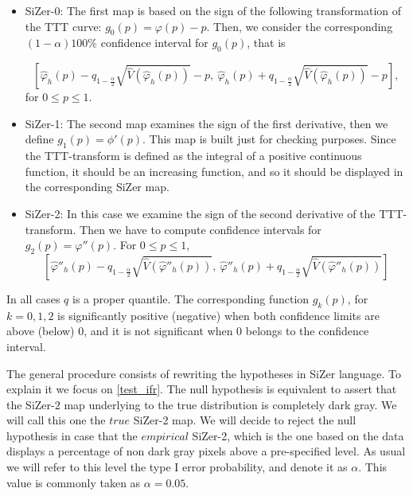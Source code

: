 \documentclass[preprint,12pt]{elsarticle}
\begin{document}
\begin{itemize}
\item SiZer-0:
\noindent The first map is based on the sign of the following transformation of the  TTT curve: $g_0(p)=\varphi(p) - p$.
Then, we consider the corresponding $(1-\alpha)100\%$ confidence interval for $g_0(p)$, that is 

\[
\left[\widehat{\varphi}_h(p)-q_{1-\frac{\alpha}{2}}\sqrt{\widehat{V}\left(\widehat{\varphi}_h(p)\right)}-p, \ \widehat{\varphi}_h(p)+q_{1-\frac{\alpha}{2}}\sqrt{\widehat{V}\left(\widehat{\varphi}_h(p)\right) }- p \right],
\]
\noindent for $0\leq p \leq 1$.


\item SiZer-1:
\noindent The second map examines the sign of the first derivative, then we define $g_1(p)=\phi'(p)$. This map is built just for checking purposes. Since the TTT-transform is defined as the integral of a positive continuous function, it should be an increasing function, and so it should be displayed in the corresponding SiZer map. %

\item SiZer-2:
\noindent In this case we examine the sign of the second derivative of the TTT-transform. Then we have to compute confidence intervals for $g_2(p)=\varphi''(p)$. For $0\leq p \leq 1$,
\begin{equation}\label{ci_d2phi}
\left[\widehat{\varphi}''_h(p)-q_{1-\frac{\alpha}{2}}\sqrt{\widehat{V}\left(\widehat{\varphi}''_h(p)\right)}, \ \widehat{\varphi}''_h(p)+q_{1-\frac{\alpha}{2}}\sqrt{\widehat{V}\left(\widehat{\varphi}''_h(p)\right)}\right]
\end{equation}

\end{itemize}
In all cases $q$ is a proper quantile. The corresponding function $g_k(p)$, for $k =0,1,2$ is significantly positive (negative) when both confidence limits are above (below) 0, and it is not significant when 0 belongs to the confidence interval.

The general procedure consists of rewriting the hypotheses in SiZer language. To explain it we focus on \eqref{test_ifr}. The null hypothesis is equivalent to assert that the  SiZer-$2$ map underlying to the true distribution is completely dark gray. We will call this one the $true$ SiZer-2 map. We will decide to reject the null hypothesis in case that the $empirical$ SiZer-2, which is the one based on the data  displays a percentage of non dark gray pixels above a pre-specified level. As usual we will refer to this level the type I error probability, and denote it as $\alpha$. This value is commonly taken as $\alpha=0.05$. 
\end{document}
